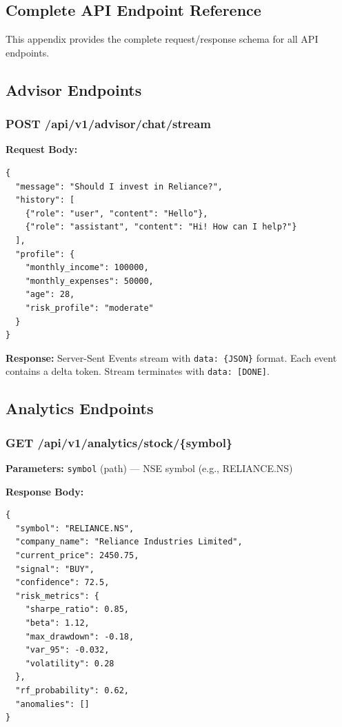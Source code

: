 \documentclass[12pt, a4paper, oneside]{report}
\begin{document}
\begin{appendices}

\chapter{Complete API Endpoint Reference}
\label{app:api_reference}

This appendix provides the complete request/response schema for all API endpoints.

\section{Advisor Endpoints}

\subsection{POST /api/v1/advisor/chat/stream}

\textbf{Request Body:}
\begin{lstlisting}[style=pythonstyle, language={}]
{
  "message": "Should I invest in Reliance?",
  "history": [
    {"role": "user", "content": "Hello"},
    {"role": "assistant", "content": "Hi! How can I help?"}
  ],
  "profile": {
    "monthly_income": 100000,
    "monthly_expenses": 50000,
    "age": 28,
    "risk_profile": "moderate"
  }
}
\end{lstlisting}

\textbf{Response:} Server-Sent Events stream with \texttt{data: \{JSON\}} format. Each event contains a delta token. Stream terminates with \texttt{data: [DONE]}.

\section{Analytics Endpoints}

\subsection{GET /api/v1/analytics/stock/\{symbol\}}

\textbf{Parameters:} \texttt{symbol} (path) --- NSE symbol (e.g., RELIANCE.NS)

\textbf{Response Body:}
\begin{lstlisting}[style=pythonstyle, language={}]
{
  "symbol": "RELIANCE.NS",
  "company_name": "Reliance Industries Limited",
  "current_price": 2450.75,
  "signal": "BUY",
  "confidence": 72.5,
  "risk_metrics": {
    "sharpe_ratio": 0.85,
    "beta": 1.12,
    "max_drawdown": -0.18,
    "var_95": -0.032,
    "volatility": 0.28
  },
  "rf_probability": 0.62,
  "anomalies": []
}
\end{lstlisting}


\end{appendices}
\end{document}
